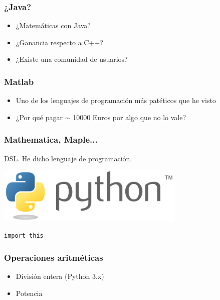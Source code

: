 \documentclass{beamer}
\begin{document}
\begin{frame}
  \frametitle{¿Java?}
  \begin{itemize}
  \item ¿Matemáticas con Java?
  \item ¿Ganancia respecto a C++?
  \item ¿Existe una comunidad de usuarios?
  \end{itemize}
\end{frame}

\begin{frame}
  \frametitle{Matlab}
  \begin{itemize}
  \item Uno de los lenguajes de programación más patéticos que he
    visto
  \item ¿Por qué pagar $\sim$ 10000 Euros por algo que no lo vale?
  \end{itemize}
\end{frame}

\begin{frame}
  \frametitle{Mathematica, Maple...}
  \begin{center}
    DSL. He dicho lenguaje de programación.
  \end{center}
\end{frame}

\begin{frame}
\begin{center}
 \includegraphics[width=9cm]{files/python-logo-generic.pdf}\\
\end{center}
\texttt{import this}
\end{frame}


\begin{frame}
  \frametitle{Operaciones aritméticas}
  \testcode
  \begin{itemize}
  \item División entera (Python 3.x)
  \item Potencia
  \end{itemize}
\end{frame}
\end{document}
